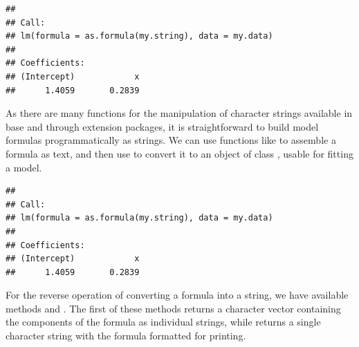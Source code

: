 \documentclass[krantz2]{krantz}\usepackage{knitr}
\begin{document}
\begin{explainbox}
\begin{knitrout}\footnotesize
{}\color{fgcolor}\begin{kframe}
\begin{alltt}
 \hlkwb{<-} 
\hlstd{(}  
\end{alltt}
\begin{verbatim}
##
## Call:
## lm(formula = as.formula(my.string), data = my.data)
##
## Coefficients:
## (Intercept)            x
##      1.4059       0.2839
\end{verbatim}
\end{kframe}
\end{knitrout}

As there are many functions for the manipulation of character strings available in base \Rlang and through extension packages, it is straightforward to build model formulas programmatically as strings. We can use functions like  to assemble a formula as text, and then use  to convert it to an object of class , usable for fitting a model.

\begin{knitrout}\footnotesize
{}\color{fgcolor}\begin{kframe}
\begin{alltt}
 \hlkwb{<-} \hlstd{(}\hlstd{,} \hlstd{,}  \hlstd{=} \hlstd{)}
\hlstd{(}  
\end{alltt}
\begin{verbatim}
##
## Call:
## lm(formula = as.formula(my.string), data = my.data)
##
## Coefficients:
## (Intercept)            x
##      1.4059       0.2839
\end{verbatim}
\end{kframe}
\end{knitrout}

For the reverse operation of converting a formula into a string, we have available methods  and . The first of these methods returns a character vector containing the components of the formula as individual strings, while  returns a single character string with the formula formatted for printing.


\end{explainbox}
\end{document}
